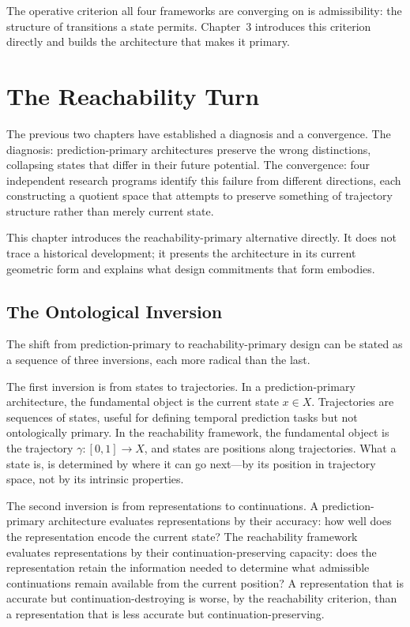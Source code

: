 \documentclass[12pt, oneside]{book}
\theoremstyle{flyxion}
\theoremstyle{definition}
\begin{document}
The operative criterion all four frameworks are converging on is
admissibility: the structure of transitions a state permits. Chapter~3
introduces this criterion directly and builds the architecture that
makes it primary.

\chapter{The Reachability Turn}

The previous two chapters have established a diagnosis and a
convergence. The diagnosis: prediction-primary architectures preserve
the wrong distinctions, collapsing states that differ in their future
potential. The convergence: four independent research programs identify
this failure from different directions, each constructing a quotient
space that attempts to preserve something of trajectory structure
rather than merely current state.

This chapter introduces the reachability-primary alternative directly.
It does not trace a historical development; it presents the
architecture in its current geometric form and explains what
design commitments that form embodies.

\section{The Ontological Inversion}

The shift from prediction-primary to reachability-primary design can be
stated as a sequence of three inversions, each more radical than the
last.

The first inversion is from states to trajectories. In a
prediction-primary architecture, the fundamental object is the current
state $x \in X$. Trajectories are sequences of states, useful for
defining temporal prediction tasks but not ontologically primary.
In the reachability framework, the fundamental object is the trajectory
$\gamma : [0,1] \to X$, and states are positions along trajectories.
What a state is, is determined by where it can go next---by its
position in trajectory space, not by its intrinsic properties.

The second inversion is from representations to continuations. A
prediction-primary architecture evaluates representations by their
accuracy: how well does the representation encode the current state?
The reachability framework evaluates representations by their
continuation-preserving capacity: does the representation retain the
information needed to determine what admissible continuations remain
available from the current position? A representation that is accurate
but continuation-destroying is worse, by the reachability criterion,
than a representation that is less accurate but continuation-preserving.
\end{document}
